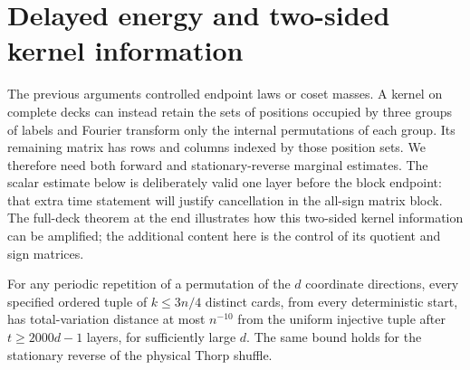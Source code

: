 \section{Delayed energy and two-sided kernel information}
\label{lifts:three-groups}

The previous arguments controlled endpoint laws or coset masses. A
kernel on complete decks can instead retain the sets of positions
occupied by three groups of labels and Fourier transform only the
internal permutations of each group. Its remaining matrix has rows
and columns indexed by those position sets. We therefore need both
forward and stationary-reverse marginal estimates. The scalar estimate
below is deliberately valid one layer before the block endpoint:
that extra time statement will justify cancellation in the all-sign
matrix block. The full-deck theorem at the end illustrates how this
two-sided kernel information can be amplified; the additional content
here is the control of its quotient and sign matrices.

\begin{lemma}
\label{lifts:delayed-marginal}
For any periodic repetition of a permutation of the $d$ coordinate directions, every
specified ordered tuple of $k\le3n/4$ distinct cards, from every
deterministic start, has total-variation distance at most $n^{-10}$
from the uniform injective tuple after $t\ge2000d-1$ layers, for
sufficiently large $d$. The same bound holds for the stationary
reverse of the physical Thorp shuffle.
\end{lemma}

